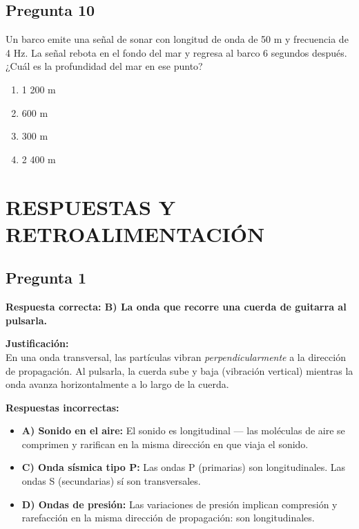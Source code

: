 \begin{preguntabox}
\subsection*{Pregunta 10}
Un barco emite una señal de sonar con longitud de onda de 50 m y frecuencia de 4 Hz. La señal rebota en el fondo del mar y regresa al barco 6 segundos después. ¿Cuál es la profundidad del mar en ese punto?

\begin{enumerate}
    \item[A)] 1 200 m
    \item[B)] 600 m
    \item[C)] 300 m
    \item[D)] 2 400 m
\end{enumerate}
\end{preguntabox}


\newpage
\onecolumn
\section*{RESPUESTAS Y RETROALIMENTACIÓN}

\begin{respuestabox}
\subsection*{Pregunta 1}
\textcolor{verdecorrecto}{\textbf{Respuesta correcta: B) La onda que recorre una cuerda de guitarra al pulsarla.}}

\textbf{Justificación:}\\
En una onda transversal, las partículas vibran \textit{perpendicularmente} a la dirección de propagación. Al pulsarla, la cuerda sube y baja (vibración vertical) mientras la onda avanza horizontalmente a lo largo de la cuerda.

\textbf{Respuestas incorrectas:}
\begin{itemize}
    \item \textbf{A) Sonido en el aire:} El sonido es longitudinal — las moléculas de aire se comprimen y rarifican en la misma dirección en que viaja el sonido.
    \item \textbf{C) Onda sísmica tipo P:} Las ondas P (primarias) son longitudinales. Las ondas S (secundarias) sí son transversales.
    \item \textbf{D) Ondas de presión:} Las variaciones de presión implican compresión y rarefacción en la misma dirección de propagación: son longitudinales.
\end{itemize}
\end{respuestabox}

